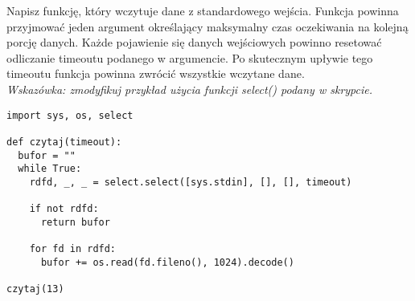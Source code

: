 % 
% 
% 
% 



\dbEntryCheckResults
Napisz funkcję, który wczytuje dane z standardowego wejścia. Funkcja powinna przyjmować jeden argument określający maksymalny czas oczekiwania na kolejną porcję danych.
Każde pojawienie się danych wejściowych powinno resetować odliczanie timeoutu podanego w argumencie. Po skutecznym upływie tego timeoutu funkcja powinna zwrócić wszystkie wczytane dane.
\\\textit{Wskazówka: zmodyfikuj przykład użycia funkcji select() podany w skrypcie.}
\fi

\dbEntryCheckResults
\begin{verbatim}
import sys, os, select

def czytaj(timeout):
  bufor = ""
  while True:
    rdfd, _, _ = select.select([sys.stdin], [], [], timeout)

    if not rdfd:
      return bufor

    for fd in rdfd:
      bufor += os.read(fd.fileno(), 1024).decode()

czytaj(13)
\end{verbatim}

